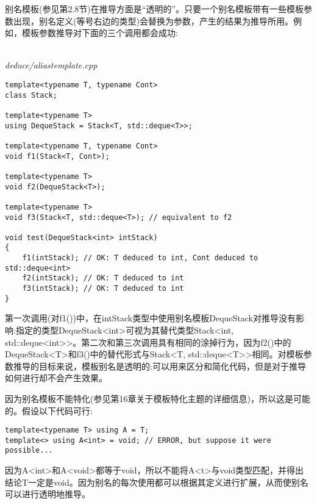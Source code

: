 别名模板(参见第2.8节)在推导方面是“透明的”。只要一个别名模板带有一些模板参数出现，别名定义(等号右边的类型)会替换为参数，产生的结果为推导所用。例如，模板参数推导对下面的三个调用都会成功:

\hspace*{\fill} \\ %
\noindent
\textit{deduce/aliastemplate.cpp}
\begin{lstlisting}[style=styleCXX]
template<typename T, typename Cont>
class Stack;

template<typename T>
using DequeStack = Stack<T, std::deque<T>>;

template<typename T, typename Cont>
void f1(Stack<T, Cont>);

template<typename T>
void f2(DequeStack<T>);

template<typename T>
void f3(Stack<T, std::deque<T>); // equivalent to f2

void test(DequeStack<int> intStack)
{
	f1(intStack); // OK: T deduced to int, Cont deduced to std::deque<int>
	f2(intStack); // OK: T deduced to int
	f3(intStack); // OK: T deduced to int
}
\end{lstlisting}

第一次调用(对f1())中，在intStack类型中使用别名模板DequeStack对推导没有影响:指定的类型DequeStack<int>可视为其替代类型Stack<int, std::deque<int>>。第二次和第三次调用具有相同的涂掉行为，因为f2()中的DequeStack<T>和f3()中的替代形式与Stack<T, std::deque<T>>相同。对模板参数推导的目标来说，模板别名是透明的:可以用来区分和简化代码，但是对于推导如何进行却不会产生效果。

因为别名模板不能特化(参见第16章关于模板特化主题的详细信息)，所以这是可能的。假设以下代码可行:

\begin{lstlisting}[style=styleCXX]
template<typename T> using A = T;
template<> using A<int> = void; // ERROR, but suppose it were possible...
\end{lstlisting}

因为A<int>和A<void>都等于void，所以不能将A<t>与void类型匹配，并得出结论T一定是void。因为别名的每次使用都可以根据其定义进行扩展，从而使别名可以进行透明地推导。

























